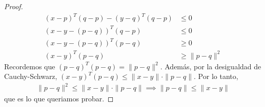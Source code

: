 \documentclass{article}
\begin{document}
\begin{proof}
\begin{align*}
    {(x-p)}^T(q-p) - {(y-q)}^T(q-p) & \leq 0             \\
    {(x-y-(p-q))}^T(q-p)            & \leq 0             \\
    {(x-y-(p-q))}^T (p-q)           & \geq 0             \\
    {(x-y)}^T (p-q)                 & \geq \| p - q \|^2
  \end{align*}
  Recordemos que \( {(p-q)}^T (p-q) = \| p - q \|^2 \). Además, por la desigualdad de Cauchy-Schwarz, \( {(x-y)}^T (p-q) \leq \| x - y \| \cdot \| p - q \| \).
  Por lo tanto, \begin{align*}
    \| p - q \|^2 \leq \| x - y \| \cdot \| p - q \| \implies \| p - q \| \leq \| x - y \|
  \end{align*}
  que es lo que queriamos probar.
\end{proof}
\end{document}
